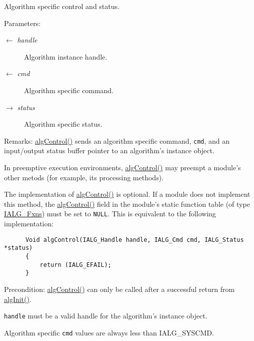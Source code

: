 Algorithm specific control and status. 

\begin{Desc}
\item[Parameters:]
\begin{description}
\item[\mbox{$\leftarrow$} {\em handle}]Algorithm instance handle. \item[\mbox{$\leftarrow$} {\em cmd}]Algorithm specific command. \item[\mbox{$\rightarrow$} {\em status}]Algorithm specific status.\end{description}
\end{Desc}
\begin{Desc}
\item[Remarks:]\hyperlink{struct_i_a_l_g___fxns_4c506a1599a604b02b30097e61ff4b89}{alg\-Control()} sends an algorithm specific command, {\tt cmd}, and an input/output status buffer pointer to an algorithm's instance object.

In preemptive execution environments, \hyperlink{struct_i_a_l_g___fxns_4c506a1599a604b02b30097e61ff4b89}{alg\-Control()} may preempt a module's other metods (for example, its processing methods).

The implementation of \hyperlink{struct_i_a_l_g___fxns_4c506a1599a604b02b30097e61ff4b89}{alg\-Control()} is optional. If a module does not implement this method, the \hyperlink{struct_i_a_l_g___fxns_4c506a1599a604b02b30097e61ff4b89}{alg\-Control()} field in the module's static function table (of type \hyperlink{struct_i_a_l_g___fxns}{IALG\_\-Fxns}) must be set to {\tt NULL}. This is equivalent to the following implementation: 

\begin{Code}\begin{verbatim}      Void algControl(IALG_Handle handle, IALG_Cmd cmd, IALG_Status *status)
      {
          return (IALG_EFAIL);
      }
\end{verbatim}\end{Code}

\end{Desc}
\begin{Desc}
\item[Precondition:]\hyperlink{struct_i_a_l_g___fxns_4c506a1599a604b02b30097e61ff4b89}{alg\-Control()} can only be called after a successful return from \hyperlink{struct_i_a_l_g___fxns_94eca7c58cceb112eccd970a6cf3f569}{alg\-Init()}.

{\tt handle} must be a valid handle for the algorithm's instance object.

Algorithm specific {\tt cmd} values are always less than IALG\_\-SYSCMD.\end{Desc}

